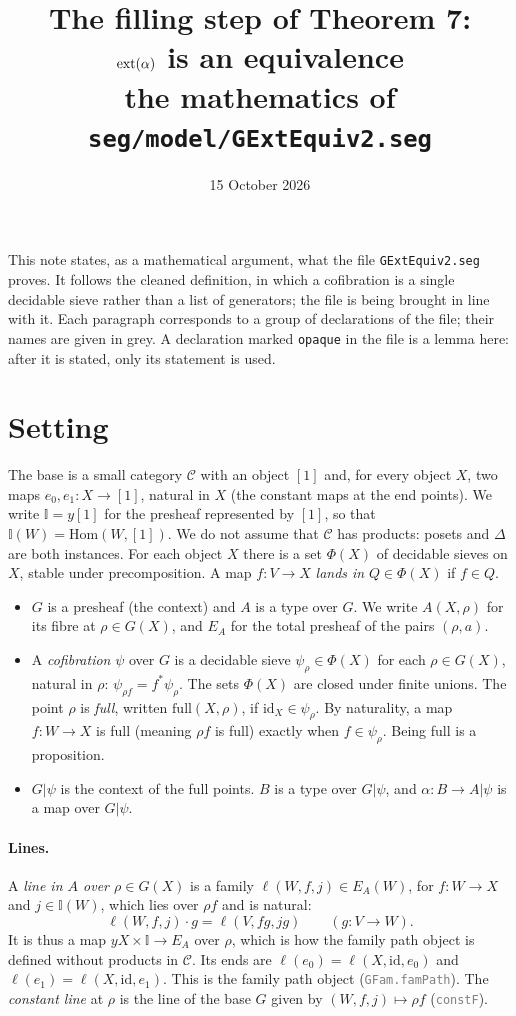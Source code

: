 \documentclass[11pt]{article}
\title{The filling step of Theorem 7:\\ $\mathrm{ext}(\alpha)$ is an equivalence\\[2pt]
\large the mathematics of \texttt{seg/model/GExtEquiv2.seg}}
\date{15 October 2026}
\author{}
\newcommand{\seg}[1]{\textcolor{gray}{\texttt{\small #1}}}
\newcommand{\Hom}{\mathrm{Hom}}
\newcommand{\I}{\mathbb{I}}
\newcommand{\full}{\mathrm{full}}
\theoremstyle{definition}
\theoremstyle{remark}
\begin{document}
\maketitle

\noindent
This note states, as a mathematical argument, what the file
\texttt{GExtEquiv2.seg} proves. It follows the cleaned definition, in which
a cofibration is a single decidable sieve rather than a list of generators;
the file is being brought in line with it. Each paragraph corresponds to a group of
declarations of the file; their names are given in grey. A declaration
marked \texttt{opaque} in the file is a lemma here: after it is stated,
only its statement is used.

\section*{Setting}

The base is a small category $\mathcal C$ with an object $[1]$ and, for
every object $X$, two maps $e_0,e_1:X\to[1]$, natural in $X$ (the constant
maps at the end points). We write $\I=y[1]$ for the presheaf represented by
$[1]$, so that $\I(W)=\Hom(W,[1])$. We do not assume that $\mathcal C$ has
products: posets
and $\Delta$ are both instances. For each object $X$ there is a set
$\Phi(X)$ of decidable sieves on $X$, stable under precomposition. A map
$f:V\to X$ \emph{lands in} $Q\in\Phi(X)$ if $f\in Q$.

\begin{itemize}
\item $G$ is a presheaf (the context) and $A$ is a type over $G$. We write
  $A(X,\rho)$ for its fibre at $\rho\in G(X)$, and $E_A$ for the total
  presheaf of the pairs $(\rho,a)$.
\item A \emph{cofibration} $\psi$ over $G$ is a decidable sieve
  $\psi_\rho\in\Phi(X)$ for each $\rho\in G(X)$, natural in $\rho$:
  $\psi_{\rho f}=f^*\psi_\rho$. The sets $\Phi(X)$ are closed under finite
  unions. The point $\rho$ is \emph{full}, written $\full(X,\rho)$, if
  $\mathrm{id}_X\in\psi_\rho$. By naturality, a map $f:W\to X$ is full
  (meaning $\rho f$ is full) exactly when $f\in\psi_\rho$. Being full is a
  proposition.
\item $G|\psi$ is the context of the full points. $B$ is a type over
  $G|\psi$, and $\alpha:B\to A|\psi$ is a map over $G|\psi$.
\end{itemize}

\paragraph{Lines.}
A \emph{line in $A$ over $\rho\in G(X)$} is a family
$\ell(W,f,j)\in E_A(W)$, for $f:W\to X$ and $j\in\I(W)$, which lies over
$\rho f$ and is natural:
\[
\ell(W,f,j)\cdot g=\ell(V,fg,jg)\qquad(g:V\to W).
\]
It is thus a map $yX\times\I\to E_A$ over $\rho$, which is how the
family path object is defined without products in $\mathcal C$. Its ends are
$\ell(e_0)=\ell(X,\mathrm{id},e_0)$ and
$\ell(e_1)=\ell(X,\mathrm{id},e_1)$. This is the family path object
(\seg{GFam.famPath}). The \emph{constant line} at $\rho$ is the line of the
base $G$ given by $(W,f,j)\mapsto\rho f$ (\seg{constF}).
\end{document}
